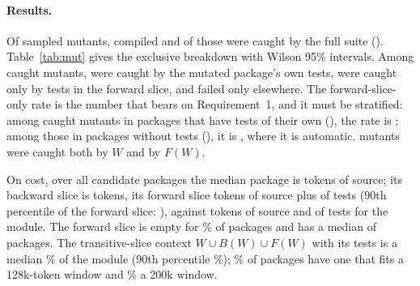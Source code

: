 \documentclass[10pt]{article}
\theoremstyle{definition}
\theoremstyle{plain}
\theoremstyle{remark}
\begin{document}
\paragraph{Results.} Of \cliNMut{} sampled mutants, \cliNCompile{} compiled and \cliNDet{} of those were caught by the full suite (\cliPctDet). Table~\ref{tab:mut} gives the exclusive breakdown with Wilson 95\% intervals. Among caught mutants, \cliPctW{} were caught by the mutated package's own tests, \cliPctFonly{} were caught only by tests in the forward slice, and \cliPctOther{} failed only elsewhere. The forward-slice-only rate is the number that bears on Requirement~1, and it must be stratified: among caught mutants in packages that have tests of their own (\cliNDetWt), the rate is \cliPctFonlyWt; among those in packages without tests (\cliNDetNt), it is \cliPctFonlyNt, where it is automatic. \cliNOverlap{} mutants were caught both by $W$ and by $F(W)$.

On cost, over all \cliNCand{} candidate packages the median package is \cliMedTokW{} tokens of source; its backward slice is \cliMedTokB{} tokens, its forward slice \cliMedTokF{} tokens of source plus \cliMedTokFt{} of tests (90th percentile of the forward slice: \cliPNinetyTokF), against \cliTotTokSrc{} tokens of source and \cliTotTokTests{} of tests for the module. The forward slice is empty for \cliPctFEmpty\% of packages and has a median of \cliMedNF{} packages. The transitive-slice context $W \cup B(W) \cup F(W)$ with its tests is a median \cliMedPctCtx\% of the module (90th percentile \cliPNinetyPctCtx\%); \cliPctFitSmall\% of packages have one that fits a 128k-token window and \cliPctFitLarge\% a 200k window.
\end{document}
